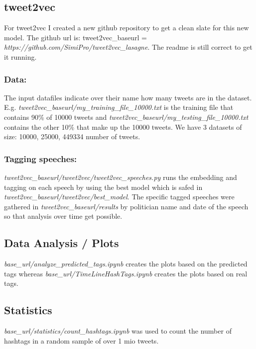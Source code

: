 \documentclass[10pt,conference,compsocconf]{IEEEtran}
\begin{document}
\subsection{tweet2vec}
For tweet2vec I created a new github repository to get a clean slate for this new model. The github url is: tweet2vec\_baseurl = \textit{https://github.com/SimiPro/tweet2vec\_lasagne}. The readme is still correct to get it running.
\subsubsection{Data:}
 The input datafiles indicate over their name how many tweets are in the dataset. E.g. \textit{tweet2vec\_baseurl/my\_training\_file\_10000.txt} is the training file that contains 90\% of 10000 tweets and \textit{tweet2vec\_baseurl/my\_testing\_file\_10000.txt} contains the other 10\% that make up the 10000 tweets. We have 3 datasets of size: 10000, 25000, 449334 number of tweets. 

\subsubsection{Tagging speeches:}
\textit{tweet2vec\_baseurl/tweet2vec/tweet2vec\_speeches.py} runs the embedding and tagging on each speech by using the best model which is safed in \textit{tweet2vec\_baseurl/tweet2vec/best\_model}. The specific tagged speeches were gathered in \textit{tweet2vec\_baseurl/results} by politician name and date of the speech so that analysis over time get possible.

\subsection{Data Analysis / Plots}
 \textit{base\_url/analyze\_predicted\_tags.ipynb} creates the plots based on the predicted tags whereas  \textit{base\_url/TimeLineHashTags.ipynb} creates the plots based on real tags. 
 
\subsection{Statistics}
\textit{base\_url/statistics/count\_hashtags.ipynb} was used to count the number of hashtags in a random sample of over 1 mio tweets. 






\end{document}

